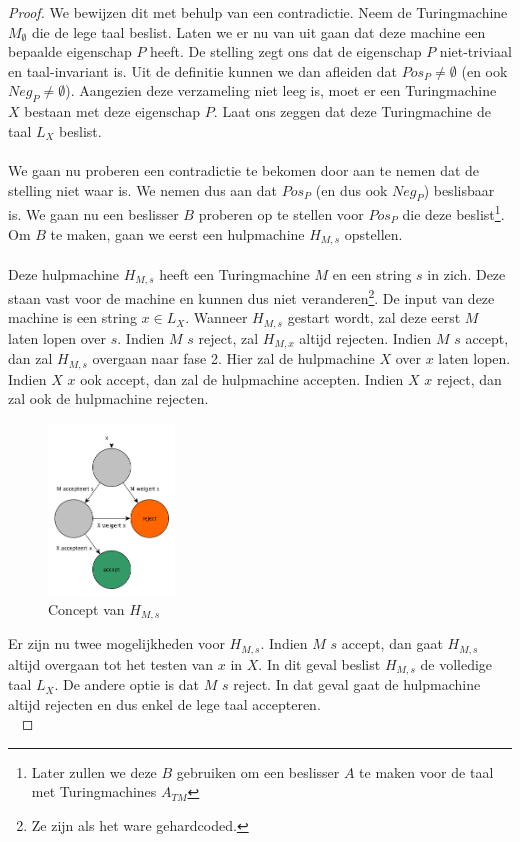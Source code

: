 \begin{proof}
	We bewijzen dit met behulp van een contradictie. Neem de Turingmachine $M_\emptyset$ die de lege taal beslist. Laten we er nu van uit gaan dat deze machine een bepaalde eigenschap $P$ heeft. De stelling zegt ons dat de eigenschap $P$ niet-triviaal en taal-invariant is. Uit de definitie kunnen we dan afleiden dat $Pos_P \neq \emptyset$ (en ook $Neg_P \neq \emptyset$). Aangezien deze verzameling niet leeg is, moet er een Turingmachine $X$ bestaan met deze eigenschap $P$. Laat ons zeggen dat deze Turingmachine de taal $L_X$ beslist.\\\\
	We gaan nu proberen een contradictie te bekomen door aan te nemen dat de stelling niet waar is. We nemen dus aan dat $Pos_P$ (en dus ook $Neg_P$) beslisbaar is. We gaan nu een beslisser $B$ proberen op te stellen voor $Pos_P$ die deze beslist\footnote{Later zullen we deze $B$ gebruiken om een beslisser $A$ te maken voor de taal met Turingmachines $A_{TM}$}. Om $B$ te maken, gaan we eerst een hulpmachine $H_{M,s}$ opstellen.\\\\
	Deze hulpmachine $H_{M,s}$ heeft een Turingmachine $M$ en een string $s$ in zich. Deze staan vast voor de machine en kunnen dus niet veranderen\footnote{Ze zijn als het ware gehardcoded.}. De input van deze machine is een string $x \in L_X$. Wanneer $H_{M,s}$ gestart wordt, zal deze eerst $M$ laten lopen over $s$. Indien $M$ $s$ reject, zal $H_{M,x}$ altijd rejecten. Indien $M$ $s$ accept, dan zal $H_{M,s}$ overgaan naar fase 2. Hier zal de hulpmachine $X$ over $x$ laten lopen. Indien $X$ $x$ ook accept, dan zal de hulpmachine accepten. Indien $X$ $x$ reject, dan zal ook de hulpmachine rejecten.
	\begin{figure}[H]
  	\centering
    	  \includegraphics[width=0.3\textwidth]{./img/HMs}
  	\caption{Concept van $H_{M,s}$}
	\end{figure}
	Er zijn nu twee mogelijkheden voor $H_{M,s}$. Indien $M$ $s$ accept, dan gaat $H_{M,s}$ altijd overgaan tot het testen van $x$ in $X$. In dit geval beslist $H_{M,s}$ de volledige taal $L_X$. De andere optie is dat $M$ $s$ reject. In dat geval gaat de hulpmachine altijd rejecten en dus enkel de lege taal accepteren.\\\

\end{proof}
